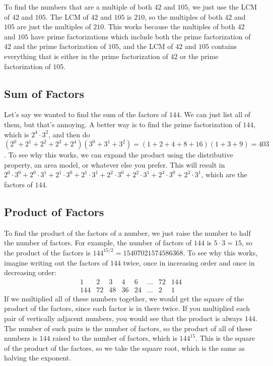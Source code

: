 \documentclass{article}
\begin{document}
\begin{multicols}{2}
	To find the numbers that are a multiple of both $42$ and $105$, we just use the LCM of $42$ and $105$.
	The LCM of $42$ and $105$ is $210$, so the multiples of both $42$ and $105$ are just the multiples of $210$.
	This works because the multiples of both $42$ and $105$ have prime factorizations which include both the prime factorization of $42$ and the prime factorization of $105$, and the LCM of $42$ and $105$ contains everything that is either in the prime factorization of $42$ or the prime factorization of $105$.
	
	\subsection*{Sum of Factors}
	Let's say we wanted to find the sum of the factors of $144$.
	We can just list all of them, but that's annoying.
	A better way is to find the prime factorization of $144$, which is $2^4 \cdot 3^2$, and then do $(2^0 + 2^1 + 2^2 + 2^3 + 2^4)(3^0 + 3^1 + 3^2) = (1 + 2 + 4 + 8 + 16)(1 + 3 + 9) = 403$.
	To see why this works, we can expand the product using the distributive property, an area model, or whatever else you prefer.
	This will result in $2^0 \cdot 3^0 + 2^0 \cdot 3^1 + 2^1 \cdot 3^0 + 2^1 \cdot 3^1 + 2^2 \cdot 3^0 + 2^2 \cdot 3^1 + 2^3 \cdot 3^0 + 2^3 \cdot 3^1$, which are the factors of $144$.
	
	\subsection*{Product of Factors}
	To find the product of the factors of a number, we just raise the number to half the number of factors.
	For example, the number of factors of $144$ is $5 \cdot 3 = 15$, so the product of the factors is $144^{15 / 2} = 15407021574586368$.
	To see why this works, imagine writing out the factors of $144$ twice, once in increasing order and once in decreasing order:
	\[
		\begin{array}{cccccccc}
			1   & 2  & 3  & 4  & 6  & \dots & 72 & 144 \\
			144 & 72 & 48 & 36 & 24 & \dots & 2  & 1
		\end{array}
	\]
	If we multiplied all of these numbers together, we would get the square of the product of the factors, since each factor is in there twice.
	If you multiplied each pair of vertically adjacent numbers, you would see that the product is always $144$.
	The number of such pairs is the number of factors, so the product of all of these numbers is $144$ raised to the number of factors, which is $144^{15}$.
	This is the square of the product of the factors, so we take the square root, which is the same as halving the exponent.
\end{multicols}
\end{document}
